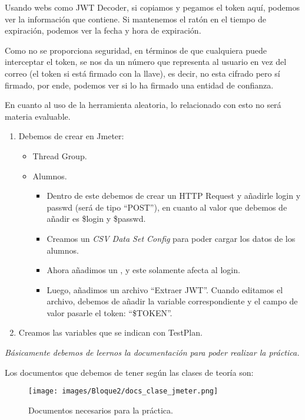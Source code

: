 Usando webs como JWT Decoder, si copiamos y pegamos el token aquí, podemos ver la información que contiene. Si mantenemos el ratón en el tiempo de expiración, podemos ver la fecha y hora de expiración. 

Como no se proporciona seguridad, en términos de que cualquiera puede interceptar el token, se nos da un número que representa al usuario en vez del correo (el token si está firmado con la llave), es decir, no esta cifrado pero sí firmado, por ende, podemos ver si lo ha firmado una entidad de confianza.

En cuanto al uso de la herramienta aleatoria, lo relacionado con esto no será materia evaluable. 

\begin{enumerate}
  \item Debemos de crear en Jmeter:
  \begin{itemize}
    \item Thread Group.
    \item Alumnos.
    \begin{itemize}
      \item Dentro de este debemos de crear un HTTP Request y añadirle login y passwd (será de tipo ``POST''), en cuanto al valor que debemos de añadir es \${login} y \${passwd}.
      \item Creamos un \textit{CSV Data Set Config} para poder cargar los datos de los alumnos.
      \item Ahora añadimos un , y este solamente afecta al login.
      \item Luego, añadimos un archivo ``Extraer JWT''. Cuando editamos el archivo, debemos de añadir la variable correspondiente y el campo de valor pasarle el token: ``\${TOKEN}''.
    \end{itemize}
  \end{itemize}
  \item Creamos las variables que se indican con TestPlan.
\end{enumerate}
\textit{Básicamente debemos de leernos la documentación para poder realizar la práctica.}

Los documentos que debemos de tener según las clases de teoría son:

\begin{figure}[H]
  \centering
  \texttt{[image: images/Bloque2/docs\_clase\_jmeter.png]}
  \caption{Documentos necesarios para la práctica.}
  \label{fig:documentos_practica}
\end{figure}

